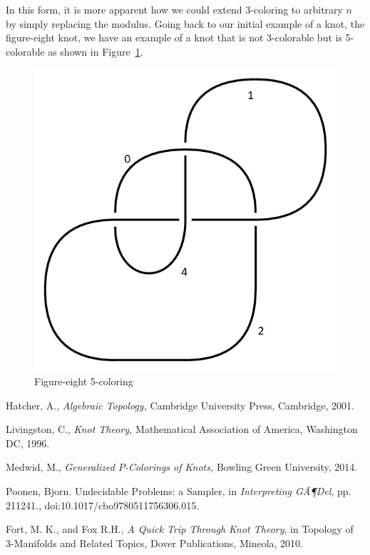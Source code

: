 \documentclass[12pt]{amsart}
\theoremstyle{definition}
\theoremstyle{remark}
\numberwithin{equation}{section}
\newcommand{\ds}{.3}
\begin{document}
In this form, it is more apparent how we could extend $3$-coloring
to arbitrary $n$ by simply replacing the modulus. Going back
to our initial example of a knot, the figure-eight knot, we have
an example of a knot that is not $3$-colorable but is 5-colorable
as shown in Figure~\ref{fig:figure-eight-c}.

\begin{figure}
  \includegraphics[scale=\ds]{figure-eight-c}
  \caption{Figure-eight 5-coloring}
  \label{fig:figure-eight-c}
\end{figure}

\pagebreak

\begin{thebibliography}{99}

  Hatcher, A., \textit{Algebraic Topology,}
  Cambridge University Press, Cambridge, 2001. 
  
  Livingston, C., \textit{Knot Theory,}
  Mathematical Association of America, Washington DC, 1996. 
  
  Medwid, M., \textit{Generalized $P$-Colorings of Knots,}
  Bowling Green University, 2014.
  
  Poonen, Bjorn. Undecidable Problems: a Sampler, in
  \textit{Interpreting GÃ¶Del}, pp. 211241., doi:10.1017/cbo9780511756306.015.
  
  Fort, M. K., and Fox R.H.,
  \textit{A Quick Trip Through Knot Theory}, in Topology of 3-Manifolds and
  Related Topics, Dover Publications, Mineola, 2010.
\end{thebibliography}
\end{document}
